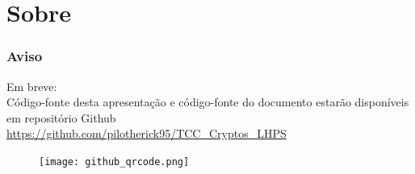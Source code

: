 \documentclass[aspectratio=43,8pt]{beamer}%
\begin{document}
	

\begin{frame}
	
\end{frame}	

\section{Sobre}

\begin{frame}
	\frametitle{Aviso}

\begin{center}
	Em breve:\\
	Código-fonte desta apresentação e código-fonte do documento estarão disponíveis em repositório Github\\
	\url{https://github.com/pilotherick95/TCC_Cryptos_LHPS}\\
	\vspace{1cm}
	\begin{minipage}{0.5\linewidth}
		\begin{figure}
			\centering
			\texttt{[image: github\_qrcode.png]}
		\end{figure}
	\end{minipage}
\end{center}

	
	
\end{frame}
\end{document}
